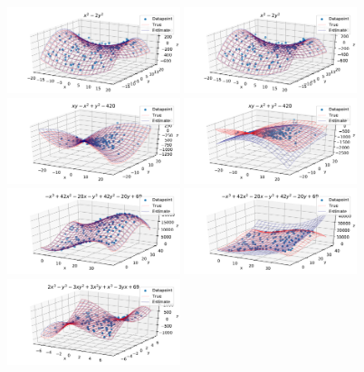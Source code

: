 \documentclass[12pt]{article}
\begin{document}
        \begin{figure}[H]
            \includegraphics[width=0.45\textwidth]{f_5_noise0_estplot_ard}
            \includegraphics[width=0.45\textwidth]{f_5_noise0_estplot_regular}
            \includegraphics[width=0.45\textwidth]{f_6_noise0_estplot_ard}
            \includegraphics[width=0.45\textwidth]{f_6_noise0_estplot_regular}
            \includegraphics[width=0.45\textwidth]{f_7_noise0_estplot_ard}
            \includegraphics[width=0.45\textwidth]{f_7_noise0_estplot_regular}
            \includegraphics[width=0.45\textwidth]{f_8_noise0_estplot_ard}

\end{figure}
\end{document}

